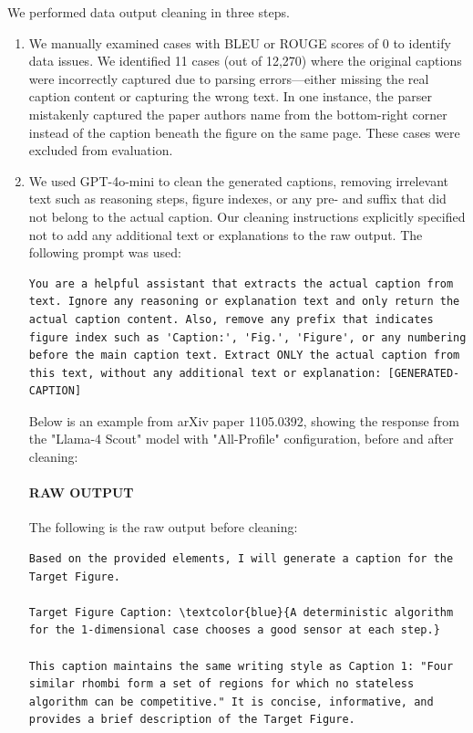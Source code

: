 We performed data output cleaning in three steps. 

\begin{enumerate}
\item We manually examined cases with BLEU or ROUGE scores of 0 to identify data issues. We identified 11 cases (out of 12,270) where the original captions were incorrectly captured due to parsing errors---either missing the real caption content or capturing the wrong text. In one instance, the parser mistakenly captured the paper authors name from the bottom-right corner instead of the caption beneath the figure on the same page. These cases were excluded from evaluation. 

\item We used GPT-4o-mini to clean the generated captions, removing irrelevant text such as reasoning steps, figure indexes, or any pre- and suffix that did not belong to the actual caption. Our cleaning instructions explicitly specified not to add any additional text or explanations to the raw output. The following prompt was used:
\begin{lstlisting}[basicstyle=\small\ttfamily, breaklines=true, frame=single]
You are a helpful assistant that extracts the actual caption from text. Ignore any reasoning or explanation text and only return the actual caption content. Also, remove any prefix that indicates figure index such as 'Caption:', 'Fig.', 'Figure', or any numbering before the main caption text. Extract ONLY the actual caption from this text, without any additional text or explanation: [GENERATED-CAPTION]
\end{lstlisting}

Below is an example from arXiv paper 1105.0392, showing the response from the "Llama-4 Scout" model with "All-Profile" configuration, before and after cleaning:

\paragraph{RAW OUTPUT}
The following is the raw output before cleaning:
\begin{Verbatim}[breaklines=true, frame=single, commandchars=\\\{\}]
Based on the provided elements, I will generate a caption for the Target Figure. 

Target Figure Caption: \textcolor{blue}{A deterministic algorithm for the 1-dimensional case chooses a good sensor at each step.}

This caption maintains the same writing style as Caption 1: "Four similar rhombi form a set of regions for which no stateless algorithm can be competitive." It is concise, informative, and provides a brief description of the Target Figure.


\end{Verbatim}
\end{enumerate}
